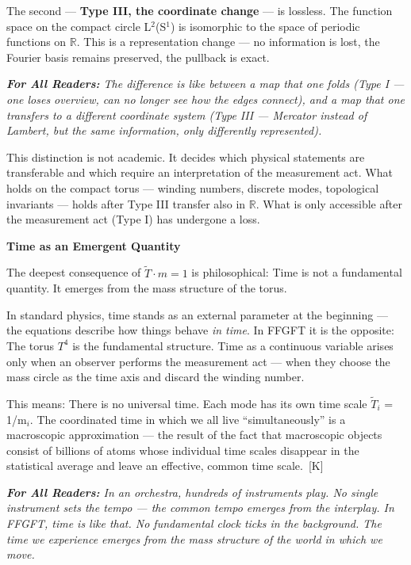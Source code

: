 \documentclass[11pt,oneside]{book}
\newcommand{\status}[1]{\penalty10000\,{\scriptsize\textcolor{gray!60}{[#1]}}}
\newenvironment{laierspur}{%
  \par\vspace{4pt}%
  \noindent\small\itshape\color{blue!60!black}%
  \textbf{For All Readers:}\enspace\ignorespaces}{%
  \par\vspace{4pt}\normalsize\normalfont\normalcolor}
\begin{document}
The second — \textbf{Type III, the coordinate change} — is lossless.
The function space on the compact circle L$^2$(S$^1$) is isomorphic to the
space of periodic functions on $\mathbb{R}$. This is a representation change —
no information is lost, the Fourier basis remains preserved, the pullback is exact.

\begin{laierspur}
The difference is like between a map that one folds (Type I — one loses
overview, can no longer see how the edges connect), and a map that one
transfers to a different coordinate system (Type III — Mercator instead of
Lambert, but the same information, only differently represented).
\end{laierspur}

This distinction is not academic. It decides which physical statements are
transferable and which require an interpretation of the measurement act.
What holds on the compact torus — winding numbers, discrete modes,
topological invariants — holds after Type III transfer also in $\mathbb{R}$.
What is only accessible after the measurement act (Type I) has undergone a loss.

\textbf{Time as an Emergent Quantity}

The deepest consequence of $\tilde{T}\cdot m = 1$ is philosophical: Time is not a
fundamental quantity. It emerges from the mass structure of the torus.

In standard physics, time stands as an external parameter at the beginning —
the equations describe how things behave \textit{in time}. In FFGFT it is the
opposite: The torus $T^4$ is the fundamental structure. Time as a continuous
variable arises only when an observer performs the measurement act — when
they choose the mass circle as the time axis and discard the winding number.

This means: There is no universal time. Each mode has its own time scale
$\tilde{T}_i$ = 1/m$_i$. The coordinated time in which we all live \enquote{simultaneously}
is a macroscopic approximation — the result of the fact that macroscopic
objects consist of billions of atoms whose individual time scales disappear
in the statistical average and leave an effective, common time scale. \status{K}

\begin{laierspur}
In an orchestra, hundreds of instruments play. No single instrument sets
the tempo — the common tempo emerges from the interplay. In FFGFT, time is
like that. No fundamental clock ticks in the background. The time we
experience emerges from the mass structure of the world in which we move.
\end{laierspur}
\end{document}

